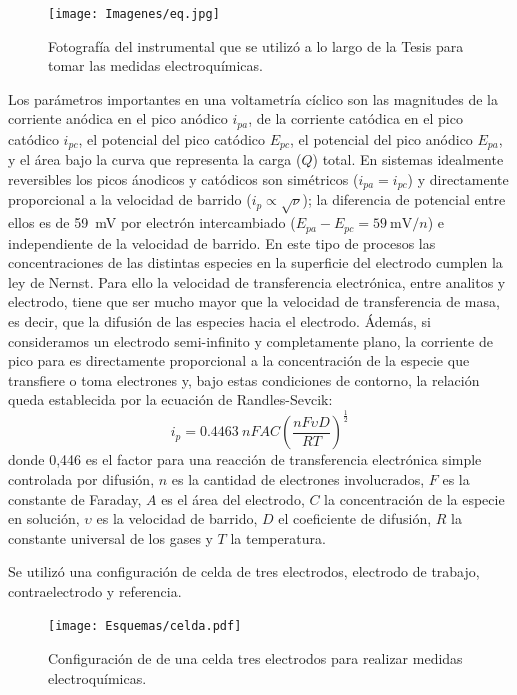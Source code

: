 	 		\begin{figure}[ht!]
			 		  \begin{center}
			 		  \texttt{[image: Imagenes/eq.jpg]}
			 		  \caption[Equipo para realizar la medidas electroquímicas]{Fotografía del instrumental que se utilizó a lo largo de la Tesis para tomar las medidas electroquímicas.}
			 		  \label{esq:eq}
			 		  \end{center}
			 		  \end{figure}		
	
	 		Los parámetros importantes en una voltametría cíclico son las magnitudes de la corriente anódica en el pico anódico $i_{pa}$, de la corriente catódica en el pico catódico $i_{pc}$, el potencial del pico catódico $E_{pc}$, el potencial del pico anódico $E_{pa}$, y el área bajo la curva que representa la carga ($Q$) total. 
	 		En sistemas idealmente reversibles los picos ánodicos y catódicos son simétricos ($i_{pa}=i_{pc}$) y directamente proporcional a la velocidad de barrido ($i_p \propto \sqrt{\nu}$); la diferencia de potencial entre ellos es de \SI{59}{\milli\volt} por electrón intercambiado ($E_{pa}-E_{pc}=\SI{59}{\milli\volt\per n}$) e independiente de la velocidad de barrido. En este tipo de procesos las concentraciones de las distintas especies en la superficie del electrodo cumplen la ley de Nernst.\cite{Wi2000,Villullas2000,Gosser}
	 		Para ello la velocidad de transferencia electrónica, entre analitos y electrodo, tiene que ser mucho mayor que la velocidad de transferencia de masa, es decir, que la difusión de las especies hacia el electrodo. Ádemás, si consideramos un electrodo semi-infinito y completamente plano, la corriente de pico para es directamente proporcional a la concentración de la especie que transfiere o toma electrones y, bajo estas condiciones de contorno, la relación queda establecida por la ecuación de Randles-Sevcik:
				\begin{equation}
					i_p=0.4463\: nFAC \left(\frac{nF\upsilon D}{RT}\right)^{\frac{1}{2}}
					\label{eq:randles-sevnic}
				\end{equation}
	 		donde 0,446 es el factor para una reacción de transferencia electrónica simple controlada por difusión, $n$ es la cantidad de electrones involucrados, $F$ es la constante de Faraday, $A$ es el área del electrodo, $C$ la concentración de la especie en solución, $\upsilon$ es la velocidad de barrido, $D$ el coeficiente de difusión, $R$ la constante universal de los gases y $T$ la temperatura.

	 		Se utilizó una configuración de celda de tres electrodos, electrodo de trabajo, contraelectrodo y referencia. 
	 				\begin{figure}[!ht]
			 		  \begin{center}
			 		  \texttt{[image: Esquemas/celda.pdf]}
			 		  \caption[Configuración de una celda de tres electrodos]{Configuración de de una celda tres electrodos para realizar medidas electroquímicas.}
			 		  \label{fig:celda}
			 		  \end{center}
			 		  \end{figure}

